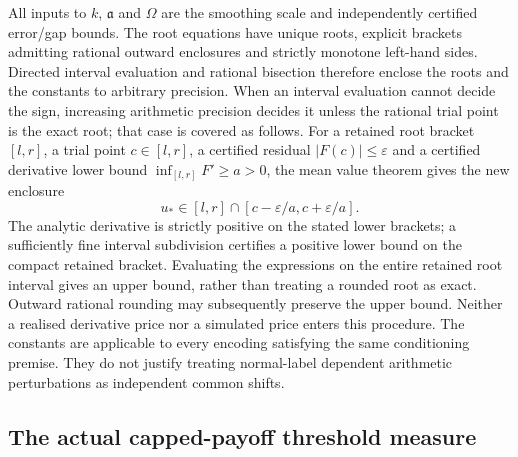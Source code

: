 \documentclass[11pt]{article}
\begin{document}
All inputs to $k$, $\mathfrak a$ and $\Omega$ are the smoothing scale and
independently certified error/gap bounds. The root equations have unique
roots, explicit brackets admitting rational outward enclosures and
strictly monotone left-hand sides. Directed interval evaluation and rational bisection
therefore enclose the roots and the constants to arbitrary precision.
When an interval evaluation cannot decide the sign, increasing arithmetic
precision decides it unless the rational trial point is the exact root;
that case is covered as follows. For a retained root bracket $[l,r]$,
a trial point $c\in[l,r]$, a certified residual $|F(c)|\leq\varepsilon$
and a certified derivative lower bound
$\inf_{[l,r]}F'\geq a>0$, the mean value theorem gives the new enclosure
\begin{equation}
 u_*\in[l,r]\cap[c-\varepsilon/a,c+\varepsilon/a].
 \label{eq:sharp-root-residual-enclosure}
\end{equation}
The analytic derivative is strictly positive on the stated lower brackets;
a sufficiently fine interval subdivision certifies a positive lower
bound on the compact retained bracket. Evaluating the expressions on the entire retained root interval
gives an upper bound, rather than treating a rounded root as exact.
Outward rational rounding may subsequently preserve the upper bound.
Neither a realised derivative price nor a simulated price enters this
procedure. The constants are applicable to every encoding satisfying the
same conditioning premise. They do not justify treating normal-label
dependent arithmetic perturbations as independent common shifts.

\subsection{The actual capped-payoff threshold measure}
\end{document}
